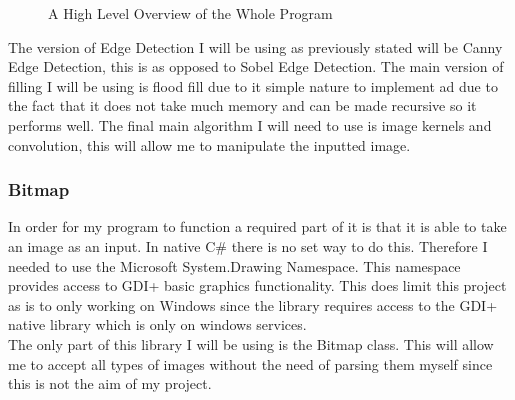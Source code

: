 \begin{flushleft}
    \begin{figure}[H]
        \centering
        \caption*{A High Level Overview of the Whole Program}
    \end{figure}

    The version of Edge Detection I will be using as previously stated will be Canny Edge Detection, this is as opposed to Sobel Edge Detection. The main version of filling I will be using is flood fill due to it simple nature to implement ad due to the fact that it does not take much memory and can be made recursive so it performs well. The final main algorithm I will need to use is image kernels and convolution, this will allow me to manipulate the inputted image.

    \subsubsection{Bitmap}
    In order for my program to function a required part of it is that it is able to take an image as an input. In native C# there is no set way to do this. Therefore I needed to use the Microsoft System.Drawing Namespace. This namespace provides access to GDI+ basic graphics functionality. This does limit this project as is to only working on Windows since the library requires access to the GDI+ native library which is only on windows services. \\
    
    The only part of this library I will be using is the Bitmap class. This will allow me to accept all types of images without the need of parsing them myself since this is not the aim of my project. 
    \\ \bk 


\end{flushleft}